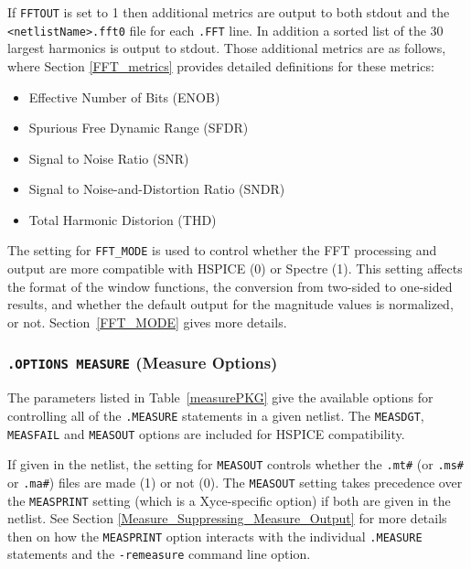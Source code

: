 If \texttt{FFTOUT} is set to 1 then additional metrics are output to both stdout
and the \verb+<netlistName>.fft0+ file for each \texttt{.FFT} line.  In
addition a sorted list of the 30 largest harmonics is output to stdout.
Those additional metrics are as follows, where Section \ref{FFT_metrics}
provides detailed definitions for these metrics:

\begin{itemize}
  \item Effective Number of Bits (ENOB)
  \item Spurious Free Dynamic Range (SFDR)
  \item Signal to Noise Ratio (SNR)
  \item Signal to Noise-and-Distortion Ratio (SNDR)
  \item Total Harmonic Distorion (THD)
\end{itemize}

The setting for \texttt{FFT\_MODE} is used to control whether the \Xyce{} FFT
processing and output are more compatible with HSPICE (0) or Spectre (1).
This setting affects the format of the window functions, the conversion from
two-sided to one-sided results, and whether the default output for the
magnitude values is normalized, or not.  Section~\ref{FFT_MODE} gives
more details.



\subsubsection{\texttt{.OPTIONS MEASURE} (Measure Options)}
The parameters listed in Table~\ref{measurePKG} give the available
options for controlling all of the \texttt{.MEASURE} statements in
a given \Xyce{} netlist.  The \texttt{MEASDGT}, \texttt{MEASFAIL}
and \texttt{MEASOUT} options are included for HSPICE compatibility.

If given in the netlist, the setting for \texttt{MEASOUT} controls whether 
the \texttt{.mt\#} (or \texttt{.ms\#} or \texttt{.ma\#}) files are made (1) or not (0). 
The \texttt{MEASOUT} setting takes precedence over the \texttt{MEASPRINT} setting 
(which is a Xyce-specific option) if both are given in the netlist.
See Section \ref{Measure_Suppressing_Measure_Output} for more details then on 
how the \texttt{MEASPRINT} option interacts with the individual 
\texttt {.MEASURE} statements and the \texttt{-remeasure} command 
line option.

